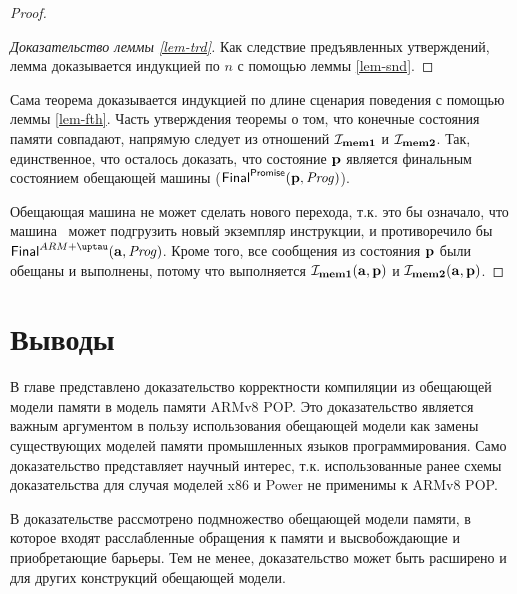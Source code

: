 \begin{proof}
\begin{proof}[Доказательство леммы \ref{lem-trd}]
  Как следствие предъявленных утверждений, лемма доказывается индукцией по $n$ с помощью леммы \ref{lem-snd}.
\end{proof}

Сама теорема доказывается индукцией по длине сценария поведения с помощью леммы \ref{lem-fth}.
Часть утверждения теоремы о том, что конечные состояния памяти совпадают,
напрямую следует из отношений $\mathcal{I}_{\rm \bf mem1}$ и $\mathcal{I}_{\rm \bf mem2}$.
Так, единственное, что осталось доказать, что состояние $\mathbf{p}$ является
финальным состоянием обещающей машины ($\mathsf{Final}^{\mathsf{Promise}}(\mathbf{p}, \mathit{Prog})$).

Обещающая машина не может сделать нового перехода, т.к. это бы означало, что
машина \ARMt~может подгрузить новый экземпляр инструкции, и противоречило бы 
$\finalStateA(\aT, \Cfarm)$. Кроме того, все сообщения из состояния $\mathbf{p}$
были обещаны и выполнены, потому что выполняется
$\mathcal{I}_{\rm \bf mem1}(\mathbf{a},\mathbf{p})$ и $\mathcal{I}_{\rm \bf mem2}(\mathbf{a}, \mathbf{p})$.
\end{proof}

\section{Выводы}
В главе представлено доказательство корректности компиляции из обещающей
модели памяти в модель памяти ARMv8 POP. Это доказательство является важным аргументом
в пользу использования обещающей модели как замены существующих моделей памяти
промышленных языков программирования.
Само доказательство представляет научный интерес, т.к. использованные ранее схемы
доказательства для случая моделей x86 и Power не применимы к ARMv8 POP.

В доказательстве рассмотрено подмножество обещающей модели памяти, в которое входят
расслабленные обращения к памяти и высвобождающие и приобретающие барьеры.
Тем не менее, доказательство может быть расширено и для других конструкций обещающей модели.
